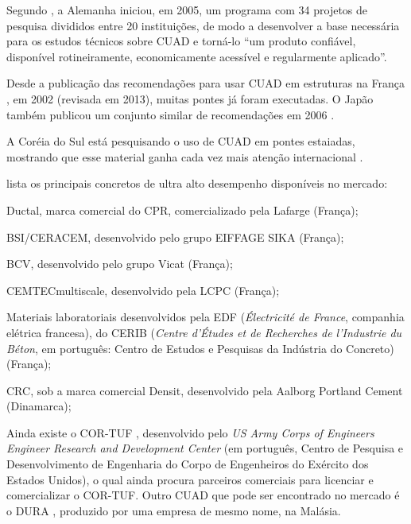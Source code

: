 Segundo , a Alemanha iniciou, em 2005, um programa com 34 projetos de pesquisa divididos entre 20 instituições, de modo a desenvolver a base necessária para os estudos técnicos sobre CUAD e torná-lo ``um produto confiável, disponível rotineiramente, economicamente acessível e regularmente aplicado''.

Desde a publicação das recomendações para usar CUAD em estruturas na França \cite{AFGC}, em 2002 (revisada em 2013), muitas pontes já foram executadas. O Japão \cite{JSCE} também publicou um conjunto similar de recomendações em 2006 \cite{Russel_e_Graybeal}.

A Coréia do Sul está pesquisando o uso de CUAD em pontes estaiadas, mostrando que esse material ganha cada vez mais atenção internacional \cite{Russel_e_Graybeal}.


 lista os principais concretos de ultra alto desempenho disponíveis no mercado:

\begin{alineas}[label=\textbullet]
  \item Ductal\textsuperscript{\textregistered}, marca comercial do CPR, comercializado pela Lafarge (França);
  \item BSI/CERACEM\textsuperscript{\textregistered}, desenvolvido pelo grupo EIFFAGE SIKA (França);
  \item BCV\textsuperscript{\textregistered}, desenvolvido pelo grupo Vicat (França);
  \item CEMTECmultiscale\textsuperscript{\textregistered}, desenvolvido pela LCPC (França);
  \item Materiais laboratoriais desenvolvidos pela EDF (\textit{Électricité de France}, companhia elétrica francesa), do CERIB (\textit{Centre d’Études et de Recherches de l’Industrie du Béton}, em português: Centro de Estudos e Pesquisas da Indústria do Concreto) (França);
  \item CRC, sob a marca comercial Densit\textsuperscript{\textregistered}, desenvolvido pela Aalborg Portland Cement (Dinamarca);
\end{alineas}

Ainda existe o COR-TUF\textsuperscript{\textregistered} \cite{Durst}, desenvolvido pelo \textit{US Army Corps of Engineers Engineer Research and Development Center} (em português, Centro de Pesquisa e Desenvolvimento de Engenharia do Corpo de Engenheiros do Exército dos Estados Unidos), o qual ainda procura parceiros comerciais para licenciar e comercializar o COR-TUF\textsuperscript{\textregistered}. Outro CUAD que pode ser encontrado no mercado é o DURA\textsuperscript{\textregistered} \cite{Dura}, produzido por uma empresa de mesmo nome, na Malásia.

